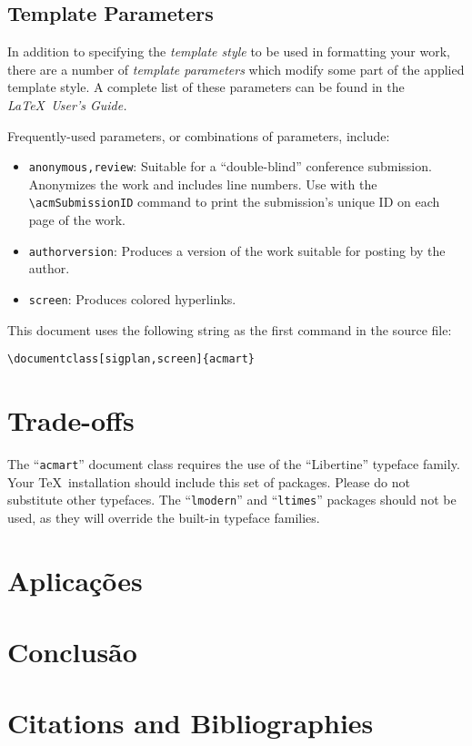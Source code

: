 \documentclass[sigplan,screen]{acmart}
\begin{document}
\subsection{Template Parameters}

In addition to specifying the {\itshape template style} to be used in
formatting your work, there are a number of {\itshape template parameters}
which modify some part of the applied template style. A complete list
of these parameters can be found in the {\itshape \LaTeX\ User's Guide.}

Frequently-used parameters, or combinations of parameters, include:
\begin{itemize}
\item {\verb|anonymous,review|}: Suitable for a ``double-blind''
  conference submission. Anonymizes the work and includes line
  numbers. Use with the \verb|\acmSubmissionID| command to print the
  submission's unique ID on each page of the work.
\item{\verb|authorversion|}: Produces a version of the work suitable
  for posting by the author.
\item{\verb|screen|}: Produces colored hyperlinks.
\end{itemize}

This document uses the following string as the first command in the
source file:
\begin{verbatim}
\documentclass[sigplan,screen]{acmart}
\end{verbatim}


\section{Trade-offs}

The ``\verb|acmart|'' document class requires the use of the
``Libertine'' typeface family. Your \TeX\ installation should include
this set of packages. Please do not substitute other typefaces. The
``\verb|lmodern|'' and ``\verb|ltimes|'' packages should not be used,
as they will override the built-in typeface families.

\section{Aplicações}

\section{Conclusão}

\section{Citations and Bibliographies}



\end{document}
